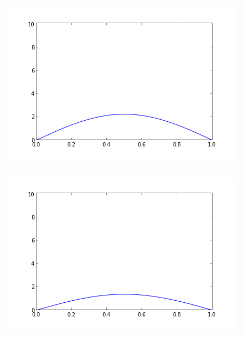 \documentclass[12pt,fleqn]{article}\usepackage{../common}
\begin{document}
\includegraphics[height=4cm]{heat-2-60.png}

\includegraphics[height=4cm]{heat-2-80.png}
\end{document}
